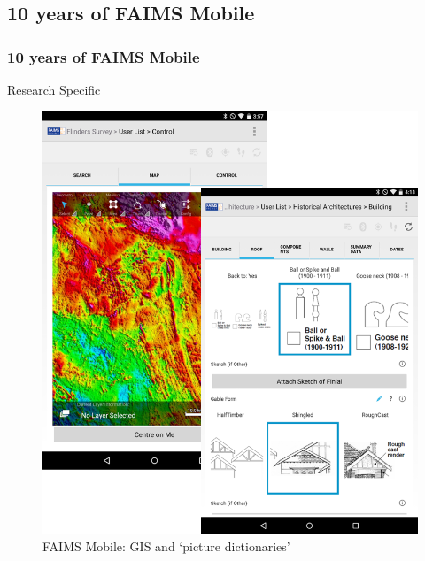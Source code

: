 \documentclass[
	aspectratio=169, %
	12pt, %
	t, %
]{beamer}
\begin{document}
\begin{refsegment}

\section{10 years of FAIMS Mobile}

\begin{sectionframe} %
	\frametitle{10 years of FAIMS Mobile}


\end{sectionframe}



\begin{frame}{Research Specific}
 \begin{figure}[H]
    \centering
    \vspace{-0.5cm}
        \includegraphics[height=.75\textheight]{figures/FAIMS-screenshots.png}
        \caption{FAIMS Mobile: GIS and `picture dictionaries'}
        \label{fig:FAIMS-mobile-screenshots}
 \end{figure}
\end{frame}


\end{refsegment}
\end{document}
